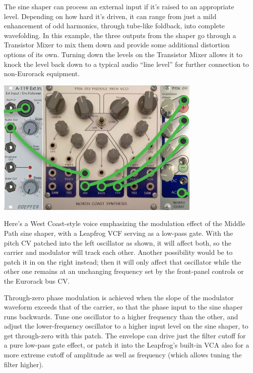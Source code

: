 The sine shaper can process an external input if it's raised to an
appropriate level.  Depending on how hard it's driven, it can range from
just a mild enhancement of odd harmonics, through tube-like foldback, into
complete wavefolding.  In this example, the three outputs from the shaper go
through a Transistor Mixer to mix them down and provide some additional
distortion options of its own.  Turning down the levels on the Transistor
Mixer allows it to knock the level back down to a typical audio ``line
level'' for further connection to non-Eurorack equipment.

\nopagebreak\noindent
{\hspace*{\fill}\includegraphics[scale=0.4]{mp-patch5.png}\hspace*{\fill}\par} 

Here's a West Coast-style voice emphasizing the modulation effect of
the Middle Path sine shaper, with a Leapfrog VCF serving as a low-pass
gate.  With the pitch CV patched into the left oscillator as shown, it will
affect both, so the carrier and modulator will track each other.  Another
possibility would be to patch it in on the right instead; then it will only
affect that oscillator while the other one remains at an unchanging
frequency set by the front-panel controls or the Eurorack bus CV.

Through-zero phase modulation is achieved when the slope of the
modulator waveform exceeds that of the carrier, so that the phase input to
the sine shaper runs backwards.  Tune one oscillator to a higher frequency
than the other, and adjust the lower-frequency oscillator to a higher input
level on the sine shaper, to get through-zero with this patch.  The envelope can
drive just the filter cutoff for a pure low-pass gate effect, or patch it into
the Leapfrog's built-in VCA also for a more extreme cutoff of amplitude as
well as frequency (which allows
tuning the filter higher).

